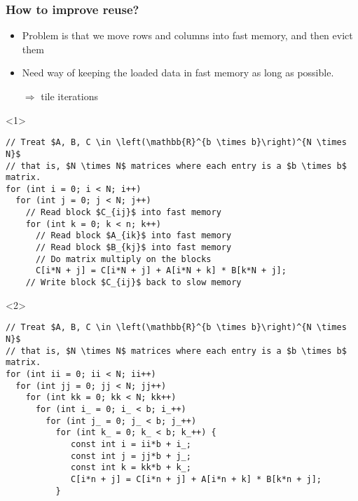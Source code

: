 \documentclass[presentation,aspectratio=43,10pt]{beamer}
\begin{document}
\begin{frame}[fragile]
  \frametitle{How to improve reuse?}
  \begin{itemize}
  \item Problem is that we move rows and columns into fast memory, and
    then evict them
  \item Need way of keeping the loaded data in fast memory as long as
    possible.
  \item[$\Rightarrow$] tile iterations
  \end{itemize}
  \begin{onlyenv}<1>
\begin{verbatim}
// Treat $A, B, C \in \left(\mathbb{R}^{b \times b}\right)^{N \times N}$
// that is, $N \times N$ matrices where each entry is a $b \times b$ matrix.
for (int i = 0; i < N; i++)
  for (int j = 0; j < N; j++)
    // Read block $C_{ij}$ into fast memory
    for (int k = 0; k < n; k++)
      // Read block $A_{ik}$ into fast memory
      // Read block $B_{kj}$ into fast memory
      // Do matrix multiply on the blocks
      C[i*N + j] = C[i*N + j] + A[i*N + k] * B[k*N + j];
    // Write block $C_{ij}$ back to slow memory
\end{verbatim}
  \end{onlyenv}
  \begin{onlyenv}<2>
\begin{verbatim}
// Treat $A, B, C \in \left(\mathbb{R}^{b \times b}\right)^{N \times N}$
// that is, $N \times N$ matrices where each entry is a $b \times b$ matrix.
for (int ii = 0; ii < N; ii++)
  for (int jj = 0; jj < N; jj++)
    for (int kk = 0; kk < N; kk++)
      for (int i_ = 0; i_ < b; i_++)
        for (int j_ = 0; j_ < b; j_++)
          for (int k_ = 0; k_ < b; k_++) {
             const int i = ii*b + i_;
             const int j = jj*b + j_;
             const int k = kk*b + k_;
             C[i*n + j] = C[i*n + j] + A[i*n + k] * B[k*n + j];
          }
\end{verbatim}
  \end{onlyenv}
\end{frame}
\end{document}
